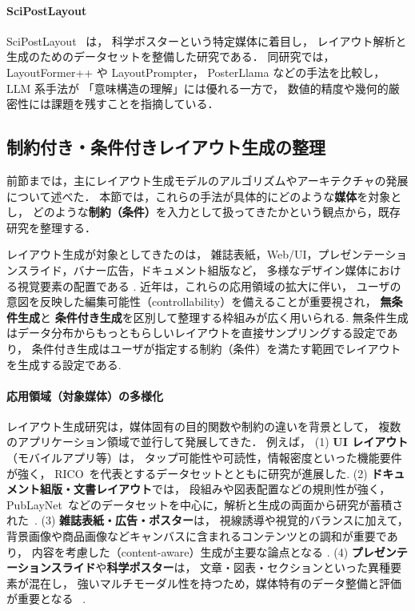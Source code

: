 \documentclass[a4j,12pt,dvipdfmx]{jsreport}
\begin{document}
\paragraph{SciPostLayout}
SciPostLayout~\cite{tanaka_scipostlayout_2024} は，
科学ポスターという特定媒体に着目し，
レイアウト解析と生成のためのデータセットを整備した研究である．
同研究では，
LayoutFormer++ や LayoutPrompter，
PosterLlama などの手法を比較し，
LLM 系手法が
「意味構造の理解」には優れる一方で，
数値的精度や幾何的厳密性には課題を残すことを指摘している．

\subsection{制約付き・条件付きレイアウト生成の整理}
\label{sec:conditional_layout_generation}
前節までは，主にレイアウト生成モデルのアルゴリズムやアーキテクチャの発展について述べた．
本節では，これらの手法が具体的にどのような\textbf{媒体}を対象とし，
どのような\textbf{制約（条件）}を入力として扱ってきたかという観点から，既存研究を整理する．

レイアウト生成が対象としてきたのは，
雑誌表紙，Web/UI，プレゼンテーションスライド，バナー広告，ドキュメント組版など，
多様なデザイン媒体における視覚要素の配置である
\cite{deka_rico_2017,zhong_publaynet_2019,tanaka_scipostlayout_2024,huang_survey_2023,shi_intelligent_2023}.
近年は，これらの応用領域の拡大に伴い，
ユーザの意図を反映した編集可能性（controllability）を備えることが重要視され，
\textbf{無条件生成}と
\textbf{条件付き生成}を区別して整理する枠組みが広く用いられる.
無条件生成はデータ分布からもっともらしいレイアウトを直接サンプリングする設定であり，
条件付き生成はユーザが指定する制約（条件）を満たす範囲でレイアウトを生成する設定である.

\vspace{0.5em}
\paragraph{応用領域（対象媒体）の多様化}
レイアウト生成研究は，媒体固有の目的関数や制約の違いを背景として，
複数のアプリケーション領域で並行して発展してきた．
例えば，
(1) \textbf{UI レイアウト}（モバイルアプリ等）は，
タップ可能性や可読性，情報密度といった機能要件が強く，
RICO~\cite{deka_rico_2017}を代表とするデータセットとともに研究が進展した.
(2) \textbf{ドキュメント組版・文書レイアウト}では，
段組みや図表配置などの規則性が強く，
PubLayNet~\cite{zhong_publaynet_2019}などのデータセットを中心に，解析と生成の両面から研究が蓄積された~\cite{li2020docbank,li2019tablebank,huang2022layoutlmv3,li2022dit}.
(3) \textbf{雑誌表紙・広告・ポスター}は，
視線誘導や視覚的バランスに加えて，
背景画像や商品画像などキャンバスに含まれるコンテンツとの調和が重要であり，
内容を考慮した（content-aware）生成が主要な論点となる
\cite{yang2019contentgan,li2020cglgan,xu2020dsgan,seol_posterllama_2024}.
(4) \textbf{プレゼンテーションスライド}や\textbf{科学ポスター}は，
文章・図表・セクションといった異種要素が混在し，
強いマルチモーダル性を持つため，媒体特有のデータ整備と評価が重要となる
~\cite{tanaka_scipostlayout_2024}.
\end{document}
